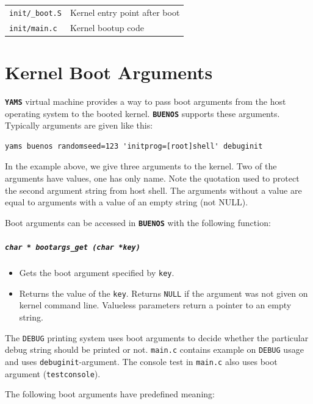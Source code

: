 \documentclass[twoside,a4paper]{report}
\makeatletter
\newcommand{\PBS}[1]{\let\temp=\\#1\let\\=\temp}
\newlength{\tablewidth}
\newenvironment{function}[3]{%
\paragraph{\texttt{#1 {\textbf{#2}} (#3)}}%
\index{#2@\texttt{#2}}%
\begin{itemize}%
}{%
\end{itemize}%
}
\newcommand{\buenos}{\texttt{\textbf{BUENOS}}}
\newcommand{\yams}{\texttt{\textbf{YAMS}}}
\newenvironment{filelist}[0]{%
\vspace{\baselineskip}%
\begin{center}%
\begin{tabular}{p{4cm}>{\PBS\raggedright}p{\tablewidth-4\tabcolsep-4cm}}%
\hline%
}{%
\end{tabular}%
\end{center}%
}
\newcommand{\file}[2]{\texttt{#1} \vspace{2mm} & #2 \vspace{2mm}\\}
\makeatother
\begin{document}
\begin{filelist}

\file{init/\_boot.S}{Kernel entry point after boot}

\file{init/main.c}{Kernel bootup code}

\end{filelist}

\appendix

\chapter{Kernel Boot Arguments}
\label{sec:bootargs}

\yams{} virtual machine provides a way to pass boot arguments from the
host operating system to the booted kernel. \buenos{} supports these
arguments. Typically arguments are given like this:

\begin{verbatim}
yams buenos randomseed=123 'initprog=[root]shell' debuginit
\end{verbatim}

In the example above, we give three arguments to the kernel. Two of
the arguments have values, one has only name. Note the quotation used
to protect the second argument string from host shell. The arguments
without a value are equal to arguments with a value of an empty string
(not NULL).

Boot arguments can be accessed in \buenos{} with the following
function:

\begin{function}{char *}{bootargs\_get}{char *key}

\item Gets the boot argument specified by \texttt{key}.

\item Returns the value of the \texttt{key}. Returns \texttt{NULL} if the
argument was not given on kernel command line. Valueless parameters
return a pointer to an empty string.

\end{function}

The \texttt{DEBUG} printing system uses boot arguments to decide
whether the particular debug string should be printed or not.
\texttt{main.c} contains example on \texttt{DEBUG} usage and uses
\texttt{debuginit}-argument. The console test in \texttt{main.c} also
uses boot argument (\texttt{testconsole}).

The following boot arguments have predefined meaning:
\end{document}
